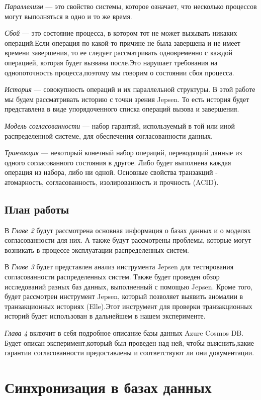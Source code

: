 \documentclass[12pt,  openany]{book}
\begin{document}
\emph{Параллелизм} ---  это свойство системы, которое означает, что несколько процессов могут выполняться в одно и то же время. 

\emph{Сбой} ---  это состояние процесса, в котором тот не может вызывать никаких операций.Если операция по какой-то причине не была завершена и не имеет времени завершения, то ее следует рассматривать одновременно с каждой операцией, которая будет вызвана после.Это нарушает требования на однопоточность процесса,поэтому мы говорим о состоянии сбоя процесса.

\emph{История} ---  совокупность операций и их параллельной структуры.  В этой работе мы будем рассматривать историю с точки зрения  Jepsen. То есть история будет представлена в виде упорядоченного списка операций вызова и завершения.

\emph{Модель согласованности} --- набор гарантий, используемый в той или иной распределенной системе,  для обеспечения согласованности данных.

\emph{Транзакция} ---  некоторый конечный набор операций, переводящий данные из одного согласованного состояния в другое. Либо будет выполнена каждая операция из набора, либо ни одной. Основные свойства транзакций - атомарность, согласованность, изолированность и прочность (ACID).


\section{План работы}
В \textit{Главе 2} будут рассмотрена основная информация о базах данных и о моделях согласованности для них. А также будут рассмотрены проблемы, которые могут возникать в процессе эксплуатации распределенных систем.
\par
В \textit{Главе 3} будет представлен анализ инструмента Jepsen для тестирования согласованности распределенных систем. Также будет проведен обзор исследований разных баз данных, выполненный с помощью Jepsen. Кроме того, будет рассмотрен инструмент Jepsen, который позволяет выявить аномалии в транзакционных историях (Elle).Этот инструмент для проверки транзакционных историй будет использован в дальнейшем в нашем эксперименте.
 \par
\textit{Глава 4} включит в себя подробное описание базы данных Azure Cosmos DB. Будет описан эксперимент,который был проведен над ней, чтобы выяснить,какие гарантии согласованности предоставлены и соответствуют ли они документации.

\chapter{Синхронизация в базах данных}
\end{document}
